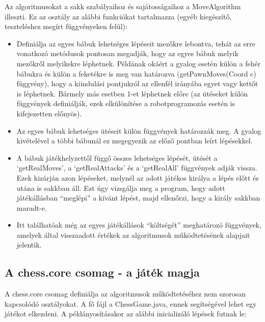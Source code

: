 \documentclass[../documentation.tex]{subfiles}
\begin{document}
Az algoritmusokat a sakk szabályaihoz és sajátosságaihoz a MoveAlgorithm illeszti. Ez az osztály az alábbi funkciókat tartalmazza (egyéb kiegészítő, teszteléshez megírt függvényeken felül):
\begin{itemize}
	\item Definiálja az egyes bábuk lehetséges lépéseit mezőkre lebontva, tehát az erre vonatkozó metódusok pontosan megadják, hogy az egyes bábuk melyik mezőkről melyikekre léphetnek. Példának okáért a gyalog esetén külön a fehér bábukra és külön a feketékre is meg van határozva (getPawnMoves(Coord c) függvény), hogy a kiindulási pontjukról az ellenfél irányába egyet vagy kettőt is léphetnek. Bármely más esetben 1-et léphetnek előre (az ütéseket külön függvények definiálják, ezek elkülönítése a robotprogramozás esetén is kifejezetten előnyös).
	\item Az egyes bábuk lehetséges ütéseit külön függvények határozzák meg. A gyalog kivételével a többi bábunál ez megegyezik az előző pontban leírt lépésekkel.
	\item A bábuk játékhelyzettől függő összes lehetséges lépését, ütését a `getRealMoves', a `getRealAttacks' és a `getRealAll' függvények adják vissza. Ezek kizárján azon lépéseket, melynél az adott játékos királya a lépés előtt és utána is sakkban áll. Ezt úgy vizsgálja meg a program, hogy adott játékállásban ``meglépi'' a kívánt lépést, majd ellenőrzi, hogy a király sakkban maradt-e.
	\item Itt találhatóak még az egyes játékállások ``költségét'' meghatározó függvények, amelyek által visszaadott értékek az algoritmusok működtetésének alapjait jelentik.
\end{itemize}

\subsection{A chess.core csomag - a játék magja}
A chess.core csomag definiálja az algoritmusok működtetéséhez nem szorosan kapcsolódó osztályokat. A fő fájl a ChessGame.java, ennek segítségével lehet egy játékot elkezdeni. A példányosításakor az alábbi inicializáló lépések futnak le:
\end{document}
